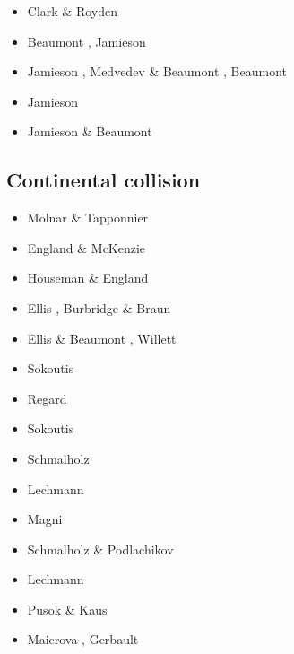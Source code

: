 \begin{scriptsize}
\begin{itemize}
\item[\twothousand] Clark \& Royden \cite{clro00}
\item[\twothousandfour] Beaumont \etal \cite{bejn04}, Jamieson \etal \cite{jabm04}
\item[\twothousandsix] Jamieson \etal \cite{jabn06}, Medvedev \& Beaumont \cite{mebe06}, 
                        Beaumont \etal \cite{benj06}
\item[\twothousandseven] Jamieson \etal \cite{jabn07}
\item[\twothousandeleven] Jamieson \& Beaumont \cite{jabe11}
\end{itemize}
\end{scriptsize}

\subsection*{Continental collision} 

\begin{scriptsize}
\begin{itemize}
\item[\nineteenseventyfive] Molnar \& Tapponnier \cite{mota75}
\item[\nineteeneightytwo] England \& McKenzie \cite{enmc82} 
\item[\nineteeneightysix] Houseman \& England \cite{hoen86a}
\item[\nineteenninetyeight] Ellis \etal \cite{elbj98}, Burbridge \& Braun \cite{bubr98}
\item[\nineteenninetynine] Ellis \& Beaumont \cite{elbe99}, Willett \cite{will99b}
\item[\twothousand] Sokoutis \etal \cite{sobm00}
\item[\twothousandthree] Regard \etal \cite{refm03}
\item[\twothousandfive] Sokoutis \etal \cite{sobb05}
\item[\twothousandnine] Schmalholz \etal \cite{sckb09}
\item[\twothousandeleven] Lechmann \etal \cite{lemk11}
\item[\twothousandtwelve] Magni \etal \cite{mavf12}
\item[\twothousandthirteen] Schmalholz \& Podlachikov \cite{scpo13}
\item[\twothousandfourteen] Lechmann \etal \cite{lesh14}
\item[\twothousandfifteen] Pusok \& Kaus \cite{puka15}
\item[\twothousandeighteen] Maierova \etal \cite{masg18}, Gerbault \etal \cite{gesr18}
\end{itemize}
\end{scriptsize}

